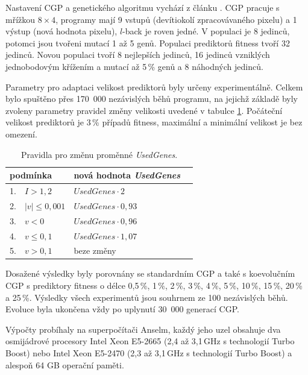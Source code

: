 \documentclass[fleqn,11pt]{ExcelAtFIT} %
\begin{document}
Nastavení CGP a genetického algoritmu vychází z článku \cite{SikuPPSN}. CGP pracuje s mřížkou $8 \times 4$, programy mají 9 vstupů (devítiokolí zpracovávaného pixelu) a 1 výstup (nová hodnota pixelu), $l$-back je roven jedné. V populaci je 8 jedinců, potomci jsou tvořeni mutací 1 až 5 genů. Populaci prediktorů fitness tvoří 32 jedinců. Novou populaci tvoří 8 nejlepších jedinců, 16 jedinců vzniklých jednobodovým křížením a mutací až 5\,\% genů a 8 náhodných jedinců.

Parametry pro adaptaci velikost prediktorů byly určeny experimentálně. Celkem bylo spuštěno přes 170~000 nezávislých běhů programu, na jejichž základě byly zvoleny parametry pravidel změny velikosti uvedené v tabulce \ref{table:rules}. Počáteční velikost prediktorů je 3\,\% případů fitness, maximální a minimální velikost je bez omezení.

\begin{table}[hbt]
    \vskip6pt
    \caption{Pravidla pro změnu proměnné \textit{UsedGenes}.}
    \label{table:rules}
    \centering
    \renewcommand{\arraystretch}{1.2}
    \begin{tabular}{llll}
        \toprule
        \multicolumn{2}{l}{podmínka}      &  nová hodnota \textit{UsedGenes}  \\
        \midrule
        1. &  $I > 1,2$                   &  $\mathit{UsedGenes} \cdot 2    $     \\
        2. &  $\left|v\right| \leq 0,001$ &  $\mathit{UsedGenes} \cdot 0,93 $  \\
        3. &  $v < 0$                     &  $\mathit{UsedGenes} \cdot 0,96 $  \\
        4. &  $v \leq 0,1$                &  $\mathit{UsedGenes} \cdot 1,07 $  \\
        5. &  $v > 0,1$                   &  beze změny             \\
        \bottomrule
    \end{tabular}
\end{table}

Dosažené výsledky byly porovnány se standardním CGP a také s koevolučním CGP s prediktory fitness o délce 0,5\,\%, 1\,\%, 2\,\%, 3\,\%, 4\,\%, 5\,\%, 10\,\%, 15\,\%, 20\,\% a 25\,\%. Výsledky všech experimentů jsou souhrnem ze 100 nezávislých běhů. Evoluce byla ukončena vždy po uplynutí 30~000 generací CGP.

Výpočty probíhaly na superpočítači Anselm, každý jeho uzel obsahuje dva osmijádrové procesory Intel Xeon E5-2665 (2,4 až 3,1\,GHz s technologií Turbo Boost) nebo Intel Xeon E5-2470 (2,3 až 3,1\,GHz s technologií Turbo Boost) a alespoň 64 GB operační paměti.
\end{document}
